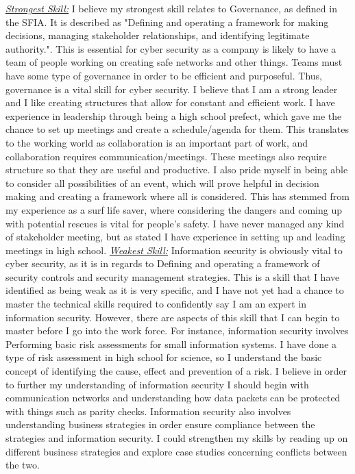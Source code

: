 \documentclass[a4paper, 11pt]{report}
\begin{document}
\underline{\emph{Strongest Skill:}}\newline
I believe my strongest skill relates to Governance\cite{SFIA}, as defined in the SFIA. It is described as "Defining and operating a framework for making decisions, managing stakeholder relationships, and identifying legitimate authority.". This is essential for cyber security as a company is likely to have a team of people working on creating safe networks and other things. Teams must have some type of governance in order to be efficient and purposeful. Thus, governance is a vital skill for cyber security. I believe that I am a strong leader and I like creating structures that allow for constant and efficient work. I have experience in leadership through being a high school prefect, which gave me the chance to set up meetings and create a schedule/agenda for them. This translates to the working world as collaboration is an important part of work, and collaboration requires communication/meetings. These meetings also require structure so that they are useful and productive. I also pride myself in being able to consider all possibilities of an event, which will prove helpful in decision making and creating a framework where all is considered. This has stemmed from my experience as a surf life saver, where considering the dangers and coming up with potential rescues is vital for people's safety. I have never managed any kind of stakeholder meeting, but as stated I have experience in setting up and leading meetings in high school.\newline\newline
\underline{\emph{Weakest Skill:}}\newline
Information security\cite{SFIA} is obviously vital to cyber security, as it is in regards to Defining and operating a framework of security controls and security management strategies. This is a skill that I have identified as being weak as it is very specific, and I have not yet had a chance to master the technical skills required to confidently say I am an expert in information security. However, there are aspects of this skill that I can begin to master before I go into the work force. For instance, information security involves Performing basic risk assessments for small information systems. I have done a type of risk assessment in high school for science, so I understand the basic concept of identifying the cause, effect and prevention of a risk. I believe in order to further my understanding of information security I should begin with communication networks and understanding how data packets can be protected with things such as parity checks. Information security also involves understanding business strategies in order ensure compliance between the strategies and information security. I could strengthen my skills by reading up on different business strategies and explore case studies concerning conflicts between the two.
\end{document}
